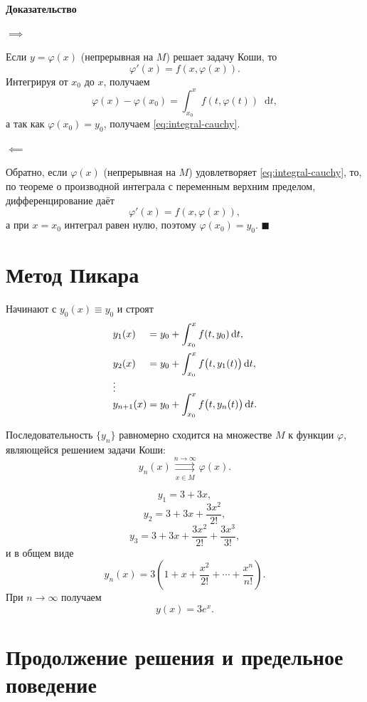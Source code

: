 \documentclass[12pt,a4paper]{article}
\numberwithin{equation}{section}
\newcommand{\dd}{\mathop{}\!\mathrm{d}}
\renewenvironment{proof}[1][Доказательство]{\begin{center}\textbf{#1}\end{center}}{\hfill$\blacksquare$\par}
\begin{document}
\begin{proof}
\(\boxed{\implies}\)

Если $y=\varphi(x)$ (непрерывная на \(M\)) решает задачу Коши, то
\[
\varphi'(x)=f(x,\varphi(x)).
\]
Интегрируя от $x_0$ до $x$, получаем
\[
\varphi(x)-\varphi(x_0)=\int_{x_0}^{x}f(t,\varphi(t))\dd t,
\]
а так как $\varphi(x_0)=y_0$, получаем \eqref{eq:integral-cauchy}.

\(\boxed{\impliedby}\)

Обратно, если $\varphi(x)$ (непрерывная на \(M\)) удовлетворяет \eqref{eq:integral-cauchy}, то, по теореме о производной интеграла с переменным верхним
пределом, дифференцирование даёт
\[
\varphi'(x)=f(x,\varphi(x)),
\]
а при $x=x_0$ интеграл равен нулю, поэтому $\varphi(x_0)=y_0$.
\end{proof}

\section{Метод Пикара}

\begin{definitionHSE}
Начинают с $y_0(x)\equiv y_0$ и строят
\[
\begin{array}{l@{\;}l}
y_1(x)     &= y_0+\displaystyle\int_{x_0}^{x} f(t,y_0)\dd t,\\[12pt]
y_2(x)     &= y_0+\displaystyle\int_{x_0}^{x} f\bigl(t,y_1(t)\bigr)\dd t,\\
\vdots     &\\[-2pt]
y_{n+1}(x) &= y_0+\displaystyle\int_{x_0}^{x} f\bigl(t,y_n(t)\bigr)\dd t.
\end{array}
\]
\end{definitionHSE}
Последовательность \(\{y_n\}\) равномерно сходится на множестве \(M\) к функции \(\varphi\), являющейся решением задачи Коши:
\[
y_n(x)\underset{x\in M}{\overset{n\to\infty}{\rightrightarrows}}\varphi(x).
\]
\begin{exampleHSE}[Задача $y'=y$, $y(0)=3$]
\[
y_1=3+3x,
\]
\[
y_2=3+3x+\frac{3x^2}{2!},
\]
\[
y_3=3+3x+\frac{3x^2}{2!}+\frac{3x^3}{3!},
\]
и в общем виде
\[
y_n(x)=3\left(1+x+\frac{x^2}{2!}+\cdots+\frac{x^n}{n!}\right).
\]
При $n\to\infty$ получаем
\[
y(x)=3e^x.
\]
\end{exampleHSE}

\section[Продолжение решения]{Продолжение решения и предельное поведение}
\end{document}

